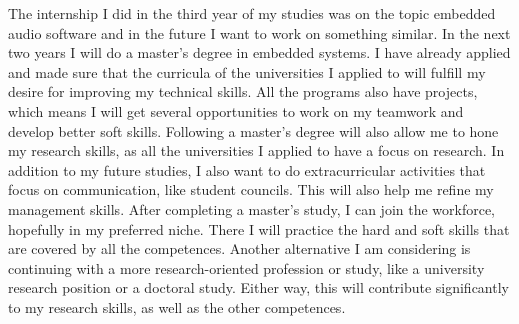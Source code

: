 \documentclass{report}
\begin{document}
The internship I did in the third year of my studies was on the topic embedded audio software and in the future I want to work on something similar. In the next two years I will do a master's degree in embedded systems. I have already applied and made sure that the curricula of the universities I applied to will fulfill my desire for improving my technical skills. All the programs also have projects, which means I will get several opportunities to work on my teamwork and develop better soft skills. Following a master's degree will also allow me to hone my research skills, as all the universities I applied to have a focus on research. In addition to my future studies, I also want to do extracurricular activities that focus on communication, like student councils. This will also help me refine my management skills. After completing a master's study, I can join the workforce, hopefully in my preferred niche. There I will practice the hard and soft skills that are covered by all the competences. Another alternative I am considering is continuing with a more research-oriented profession or study, like a university research position or a doctoral study. Either way, this will contribute significantly to my research skills, as well as the other competences.


\end{document}
